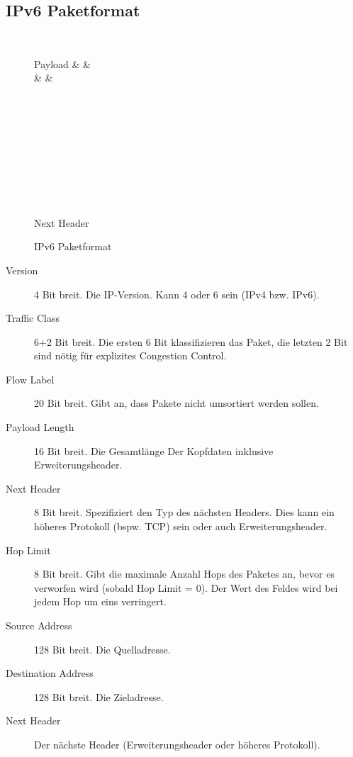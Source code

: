 		\subsection{IPv6 Paketformat}
			\begin{figure}[H]
				\centering
				\begin{bytefield}[bitwidth = 1.2em]{32}
					 \\
					\begin{rightwordgroup}{Payload}
						 &  &  \\
						 &  &  \\
						 \\
						 \\
						 \\
						 \\
						 \\
						 \\
						 \\
					\end{rightwordgroup} \\
					\begin{rightwordgroup}{Next Header}
						\bitbox{32}{}
					\end{rightwordgroup}
				\end{bytefield}
				\caption{IPv6 Paketformat}
				\label{fig:ipv6packet}
			\end{figure}

			\begin{description}
				\item[Version] 4 Bit breit. Die IP-Version. Kann 4 oder 6 sein (IPv4 bzw. IPv6).
				\item[Traffic Class] 6+2 Bit breit. Die ersten 6 Bit klassifizieren das Paket, die letzten 2 Bit sind nötig für explizites Congestion Control.
				\item[Flow Label] 20 Bit breit. Gibt an, dass Pakete nicht umsortiert werden sollen.
				\item[Payload Length] 16 Bit breit. Die Gesamtlänge Der Kopfdaten inklusive Erweiterungsheader.
				\item[Next Header] 8 Bit breit. Spezifiziert den Typ des nächsten Headers. Dies kann ein höheres Protokoll (bspw. TCP) sein oder auch Erweiterungsheader.
				\item[Hop Limit] 8 Bit breit. Gibt die maximale Anzahl Hops des Paketes an, bevor es verworfen wird (sobald Hop Limit = 0). Der Wert des Feldes wird bei jedem Hop um eins verringert.
				\item[Source Address] 128 Bit breit. Die Quelladresse.
				\item[Destination Address] 128 Bit breit. Die Zieladresse.
				\item[Next Header] Der nächste Header (Erweiterungsheader oder höheres Protokoll).
			\end{description}

